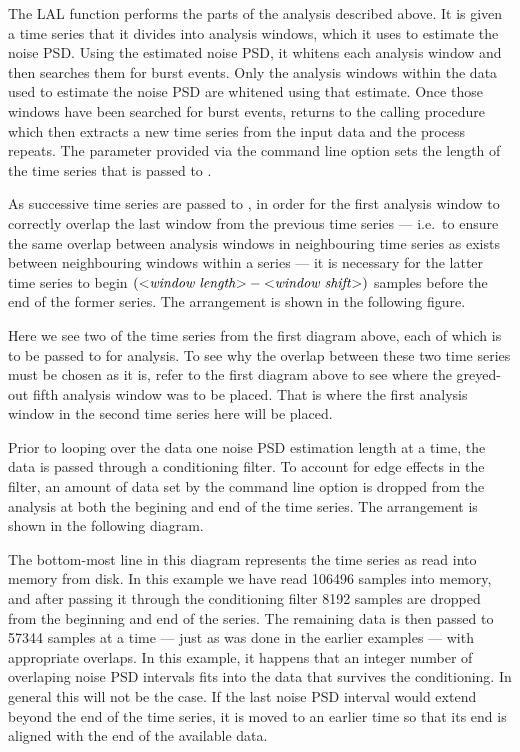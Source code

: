 The LAL function  performs the parts of the analysis
described above.  It is given a time series that it divides into analysis
windows, which it uses to estimate the noise PSD.  Using the estimated
noise PSD, it whitens each analysis window and then searches them for burst
events.  Only the analysis windows within the data used to estimate the
noise PSD are whitened using that estimate.  Once those windows have been
searched for burst events,  returns to the calling
procedure which then extracts a new time series from the input data and the
process repeats.  The parameter provided via the command line option
 sets the length of the time series that is
passed to .

As successive time series are passed to , in order for
the first analysis window to correctly overlap the last window from the
previous time series --- i.e.\ to ensure the same overlap between analysis
windows in neighbouring time series as exists between neighbouring windows
within a series --- it is necessary for the latter time series to begin
$(\mbox{$<$\textit{window length}$>$} - \mbox{$<$\textit{window shift}$>$})$ samples before
the end of the former series.  The arrangement is shown in the following
figure.
\begin{center}

\end{center}
Here we see two of the time series from the first diagram above, each of
which is to be passed to  for analysis.  To see why
the overlap between these two time series must be chosen as it is, refer to
the first diagram above to see where the greyed-out fifth analysis window
was to be placed.  That is where the first analysis window in the second
time series here will be placed.

Prior to looping over the data one noise PSD estimation length at a time,
the data is passed through a conditioning filter.  To account for edge
effects in the filter, an amount of data set by the command line option
 is dropped from the analysis at both the
begining and end of the time series.  The arrangement is shown in the
following diagram.
\begin{center}

\end{center}
The bottom-most line in this diagram represents the time series as read
into memory from disk.  In this example we have read 106496 samples into
memory, and after passing it through the conditioning filter 8192 samples
are dropped from the beginning and end of the series.  The remaining data
is then passed to  57344 samples at a time --- just as
was done in the earlier examples --- with appropriate overlaps.  In this
example, it happens that an integer number of overlaping noise PSD
intervals fits into the data that survives the conditioning.  In general
this will not be the case.  If the last noise PSD interval would extend
beyond the end of the time series, it is moved to an earlier time so that
its end is aligned with the end of the available data.

